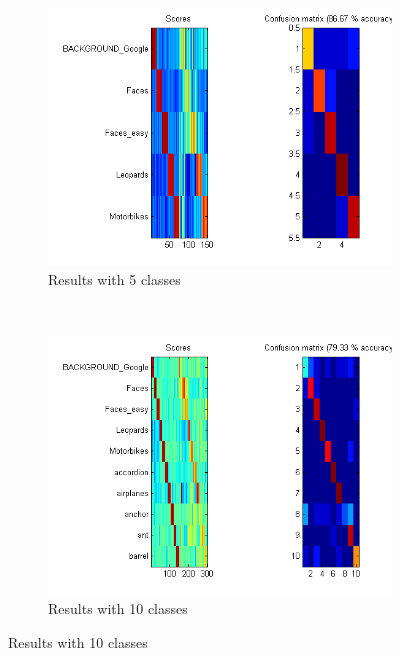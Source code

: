 \begin{figure}[htb]
	\centering
	\begin{subfigure}[t]{0.4\textwidth}
		\includegraphics[width=\textwidth]{./img/ex1/eval-steps-10.png}
		\caption{Results with 5 classes}
	\end{subfigure}
	~
	\begin{subfigure}[t]{0.4\textwidth}
		\includegraphics[width=\textwidth]{./img/ex1/eval-10-classes.png}
		\caption{Results with 10 classes}
	\end{subfigure}
	

\end{figure}
